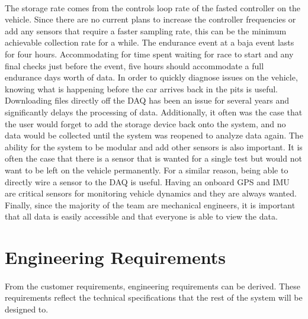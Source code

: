 \paragraph{}
The storage rate comes from the controls loop rate of the fasted controller on the vehicle.
Since there are no current plans to increase the controller frequencies or add any sensors that require a faster sampling rate, this can be the minimum achievable collection rate for a while.
The endurance event at a baja event lasts for four hours.
Accommodating for time spent waiting for race to start and any final checks just before the event, five hours should accommodate a full endurance days worth of data.
In order to quickly diagnose issues on the vehicle, knowing what is happening before the car arrives back in the pits is useful.
Downloading files directly off the DAQ has been an issue for several years and significantly delays the processing of data.
Additionally, it often was the case that the user would forget to add the storage device back onto the system, and no data would be collected until the system was reopened to analyze data again.
The ability for the system to be modular and add other sensors is also important.
It is often the case that there is a sensor that is wanted for a single test but would not want to be left on the vehicle permanently.
For a similar reason, being able to directly wire a sensor to the DAQ is useful.
Having an onboard GPS and IMU are critical sensors for monitoring vehicle dynamics and they are always wanted.
Finally, since the majority of the team are mechanical engineers, it is important that all data is easily accessible and that everyone is able to view the data.

\section{Engineering Requirements}

\paragraph{}
From the customer requirements, engineering requirements can be derived.
These requirements reflect the technical specifications that the rest of the system will be designed to.

